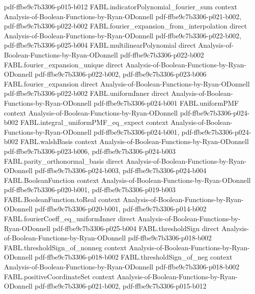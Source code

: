\begin{theorem}
  {pdf-ffbe9c7b3306-p015-b012}
\proofstep
  {FABL.indicatorPolynomial_fourier_sum}
  {context}
  {Analysis-of-Boolean-Functions-by-Ryan-ODonnell}
  {pdf-ffbe9c7b3306-p021-b002,
    pdf-ffbe9c7b3306-p022-b002}
\proofstep
  {FABL.fourier_expansion_from_interpolation}
  {direct}
  {Analysis-of-Boolean-Functions-by-Ryan-ODonnell}
  {pdf-ffbe9c7b3306-p022-b002,
    pdf-ffbe9c7b3306-p025-b004}
\proofstep
  {FABL.multilinearPolynomial}
  {direct}
  {Analysis-of-Boolean-Functions-by-Ryan-ODonnell}
  {pdf-ffbe9c7b3306-p022-b002}
\proofstep
  {FABL.fourier_expansion_unique}
  {direct}
  {Analysis-of-Boolean-Functions-by-Ryan-ODonnell}
  {pdf-ffbe9c7b3306-p022-b002,
    pdf-ffbe9c7b3306-p023-b006}
\proofstep
  {FABL.fourier_expansion}
  {direct}
  {Analysis-of-Boolean-Functions-by-Ryan-ODonnell}
  {pdf-ffbe9c7b3306-p022-b002}
\proofstep
  {FABL.uniformInner}
  {direct}
  {Analysis-of-Boolean-Functions-by-Ryan-ODonnell}
  {pdf-ffbe9c7b3306-p024-b001}
\proofstep
  {FABL.uniformPMF}
  {context}
  {Analysis-of-Boolean-Functions-by-Ryan-ODonnell}
  {pdf-ffbe9c7b3306-p024-b002}
\proofstep
  {FABL.integral_uniformPMF_eq_expect}
  {context}
  {Analysis-of-Boolean-Functions-by-Ryan-ODonnell}
  {pdf-ffbe9c7b3306-p024-b001,
    pdf-ffbe9c7b3306-p024-b002}
\proofstep
  {FABL.walshBasis}
  {context}
  {Analysis-of-Boolean-Functions-by-Ryan-ODonnell}
  {pdf-ffbe9c7b3306-p023-b006,
    pdf-ffbe9c7b3306-p024-b003}
\proofstep
  {FABL.parity_orthonormal_basis}
  {direct}
  {Analysis-of-Boolean-Functions-by-Ryan-ODonnell}
  {pdf-ffbe9c7b3306-p024-b003,
    pdf-ffbe9c7b3306-p024-b004}
\proofstep
  {FABL.BooleanFunction}
  {context}
  {Analysis-of-Boolean-Functions-by-Ryan-ODonnell}
  {pdf-ffbe9c7b3306-p020-b001,
    pdf-ffbe9c7b3306-p019-b003}
\proofstep
  {FABL.BooleanFunction.toReal}
  {context}
  {Analysis-of-Boolean-Functions-by-Ryan-ODonnell}
  {pdf-ffbe9c7b3306-p020-b001,
    pdf-ffbe9c7b3306-p014-b002}
\proofstep
  {FABL.fourierCoeff_eq_uniformInner}
  {direct}
  {Analysis-of-Boolean-Functions-by-Ryan-ODonnell}
  {pdf-ffbe9c7b3306-p025-b004}
\proofstep
  {FABL.thresholdSign}
  {direct}
  {Analysis-of-Boolean-Functions-by-Ryan-ODonnell}
  {pdf-ffbe9c7b3306-p018-b002}
\proofstep
  {FABL.thresholdSign_of_nonneg}
  {context}
  {Analysis-of-Boolean-Functions-by-Ryan-ODonnell}
  {pdf-ffbe9c7b3306-p018-b002}
\proofstep
  {FABL.thresholdSign_of_neg}
  {context}
  {Analysis-of-Boolean-Functions-by-Ryan-ODonnell}
  {pdf-ffbe9c7b3306-p018-b002}
\proofstep
  {FABL.positiveCoordinateSet}
  {context}
  {Analysis-of-Boolean-Functions-by-Ryan-ODonnell}
  {pdf-ffbe9c7b3306-p021-b002,
    pdf-ffbe9c7b3306-p015-b012}

\end{theorem}
